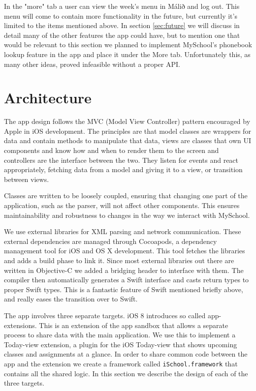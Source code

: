 \documentclass[pdftex, DIV=calc, paper=a4, fontsize=11pt]{scrartcl}	 %
\begin{document}
In the "more" tab a user can view the week's menu in Málið and log out.
This menu will come to contain more functionality in the future, but currently it's limited to the items mentioned
above. In section \ref{sec:future} we will discuss in detail many of the other features the app 
could have, but to mention one that would be relevant to this section we planned to implement
MySchool's phonebook lookup feature in the app and place it under the More tab. Unfortunately this, as
many other ideas, proved infeasible without a proper API.



\section{Architecture}
\label{sec:arch}

The app design follows the MVC (Model View Controller) pattern encouraged by Apple in iOS development.
The principles are that model classes are wrappers for data and contain methods to manipulate that
data, views are classes that own UI components and know how and when to render them to the screen
and controllers are the interface between the two. They listen for events and react appropriately, 
fetching data from a model and giving it to a view, or transition between views.

Classes are written to be loosely coupled, ensuring that changing one part of the application, such 
as the parser, will not affect other components. This ensures maintainability and robustness to
changes in the way we interact with MySchool.

We use external libraries for XML parsing and network communication. These external dependencies 
are managed through Cocoapods\cite{pods}, a dependency management tool for iOS and OS X development.
This tool fetches the libraries and adds a build phase to link it. Since most
external libraries out there are written in Objective-C we added a bridging header to interface
with them. The compiler then automatically generates a Swift interface and casts return types to 
proper Swift types. This is a fantastic feature of Swift mentioned briefly above, and really eases
the transition over to Swift.

The app involves three separate targets. iOS 8 introduces so called app-extensions\cite{extensions}. This is an extension
of the app sandbox that allows a separate process to share data with the main application. We use
this to implement a Today-view extension, a plugin for the iOS Today-view that shows upcoming classes
and assignments at a glance. In order to share common code between the app and the extension we
create a framework called \texttt{iSchool.framework} that contains all the shared logic. In this 
section we describe the design of each of the three targets.
\end{document}
